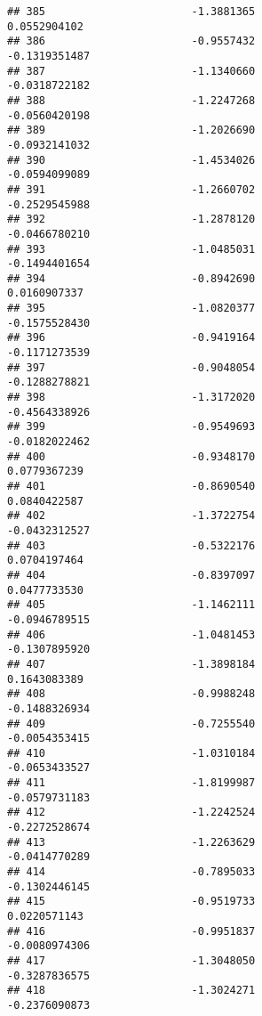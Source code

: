 \documentclass[
]{article}
\begin{document}
\begin{verbatim}
## 385                       -1.3881365                          0.0552904102
## 386                       -0.9557432                         -0.1319351487
## 387                       -1.1340660                         -0.0318722182
## 388                       -1.2247268                         -0.0560420198
## 389                       -1.2026690                         -0.0932141032
## 390                       -1.4534026                         -0.0594099089
## 391                       -1.2660702                         -0.2529545988
## 392                       -1.2878120                         -0.0466780210
## 393                       -1.0485031                         -0.1494401654
## 394                       -0.8942690                          0.0160907337
## 395                       -1.0820377                         -0.1575528430
## 396                       -0.9419164                         -0.1171273539
## 397                       -0.9048054                         -0.1288278821
## 398                       -1.3172020                         -0.4564338926
## 399                       -0.9549693                         -0.0182022462
## 400                       -0.9348170                          0.0779367239
## 401                       -0.8690540                          0.0840422587
## 402                       -1.3722754                         -0.0432312527
## 403                       -0.5322176                          0.0704197464
## 404                       -0.8397097                          0.0477733530
## 405                       -1.1462111                         -0.0946789515
## 406                       -1.0481453                         -0.1307895920
## 407                       -1.3898184                          0.1643083389
## 408                       -0.9988248                         -0.1488326934
## 409                       -0.7255540                         -0.0054353415
## 410                       -1.0310184                         -0.0653433527
## 411                       -1.8199987                         -0.0579731183
## 412                       -1.2242524                         -0.2272528674
## 413                       -1.2263629                         -0.0414770289
## 414                       -0.7895033                         -0.1302446145
## 415                       -0.9519733                          0.0220571143
## 416                       -0.9951837                         -0.0080974306
## 417                       -1.3048050                         -0.3287836575
## 418                       -1.3024271                         -0.2376090873

\end{verbatim}
\end{document}

